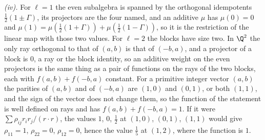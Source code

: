 \emph{(iv).} For $\ell = 1$ the even subalgebra is spanned by the orthogonal idempotents $\tfrac12(1 \pm \Gamma)$, its projectors are the four named, and an additive $\mu$ has $\mu(0) = 0$ and $\mu(1) = \mu(\tfrac12(1 + \Gamma)) + \mu(\tfrac12(1 - \Gamma))$, so it is the restriction of the linear map with those two values. For $\ell = 2$ the blocks have size two. In $\Q^{2}$ the only ray orthogonal to that of $(a, b)$ is that of $(-b, a)$, and a projector of a block is $0$, a ray or the block identity, so an additive weight on the even projectors is the same thing as a pair of functions on the rays of the two blocks, each with $f(a, b) + f(-b, a)$ constant. For a primitive integer vector $(a, b)$ the parities of $(a, b)$ and of $(-b, a)$ are $(1,0)$ and $(0,1)$, or both $(1,1)$, and the sign of the vector does not change them, so the function of the statement is well defined on rays and has $f(a, b) + f(-b, a) = 1$. If it were $\sum\rho_{ij}r_{i}r_{j}/(r \cdot r)$, the values $1$, $0$, $\tfrac12$ at $(1,0)$, $(0,1)$, $(1,1)$ would give $\rho_{11} = 1$, $\rho_{22} = 0$, $\rho_{12} = 0$, hence the value $\tfrac15$ at $(1, 2)$, where the function is $1$.
